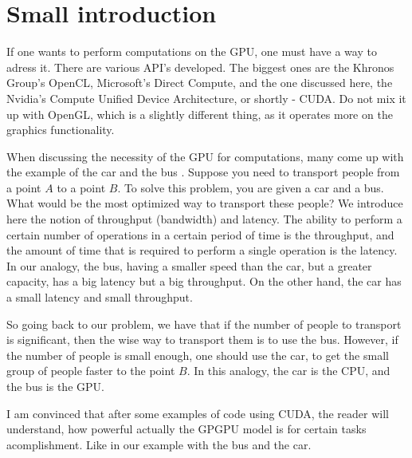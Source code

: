 \newpage

\section*{Small introduction}
If one wants to perform computations on the GPU, one must have a way to adress it. There are various
API's developed. The biggest ones are the Khronos Group's OpenCL, Microsoft's Direct Compute, and the one 
discussed here, the Nvidia's Compute Unified Device Architecture, or shortly - CUDA. Do not mix it up with 
OpenGL, which is a slightly different thing, as it operates more on the graphics functionality.


When discussing the necessity of the GPU for computations, many come up with the example of the car and the bus \cite{habr_car_vs_bus}. 
Suppose you need to transport people from a point $A$ to a point $B$. To solve this problem, you are 
given a car and a bus. What would be the most optimized way to transport these people? We introduce here
the notion of throughput (bandwidth) and latency. The ability to perform a certain number of operations in a certain period of 
time is the throughput, and the amount of time that is required to perform a single operation is the latency.
In our analogy, the bus, having a smaller speed than the car, but a greater capacity, has a big latency but 
a big throughput. On the other hand, the car has a small latency and small throughput.


So going back to our problem, we have that if the number of people to transport is significant, 
then the wise way to transport them is to use the bus. However, if the number of people is small enough, 
one should use the car, to get the small group of people faster to the point $B$. 
In this analogy, the car is the CPU, and the bus is the GPU.

I am convinced that after some examples of code using CUDA, the reader will understand, how powerful
actually the GPGPU model is for certain tasks acomplishment. Like in our example with the bus and the car.

